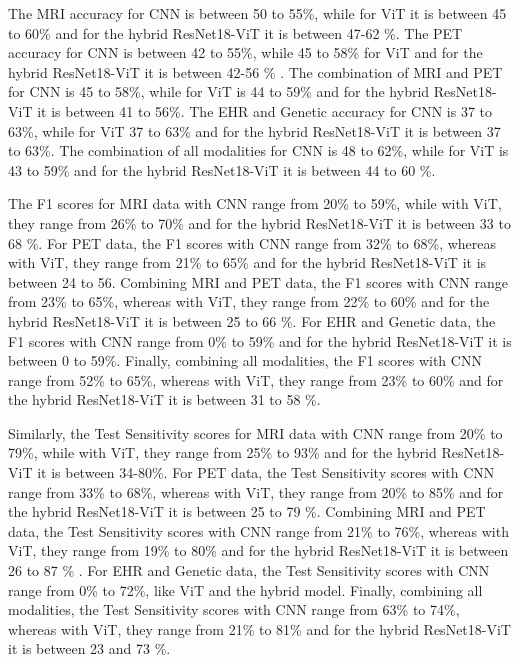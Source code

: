 The MRI accuracy for CNN is between 50 to 55\%, while for ViT it is between 45 to 60\% and for the hybrid ResNet18-ViT it is between 47-62 \%. The PET accuracy for CNN is between 42 to 55\%, while 45 to 58\% for ViT and for the hybrid ResNet18-ViT it is between 42-56 \% . The combination of MRI and PET for CNN is 45 to 58\%, while for ViT is 44 to 59\% and for the hybrid ResNet18-ViT it is between 41 to 56\%. The EHR and Genetic accuracy for CNN is 37 to 63\%, while for ViT 37 to 63\% and for the hybrid ResNet18-ViT it is between 37 to 63\%. The combination of all modalities for CNN is 48 to 62\%, while for ViT is 43 to 59\% and for the hybrid ResNet18-ViT it is between 44 to 60 \%.  

The F1 scores for MRI data with CNN range from 20\% to 59\%, while with ViT, they range from 26\% to 70\% and for the hybrid ResNet18-ViT it is between 33 to 68 \%. For PET data, the F1 scores with CNN range from 32\% to 68\%, whereas with ViT, they range from 21\% to 65\% and for the hybrid ResNet18-ViT it is between 24 to 56. Combining MRI and PET data, the F1 scores with CNN range from 23\% to 65\%, whereas with ViT, they range from 22\% to 60\% and for the hybrid ResNet18-ViT it is between 25 to 66 \%. For EHR and Genetic data, the F1 scores with CNN range from 0\% to 59\%  and for the hybrid ResNet18-ViT it is between 0 to 59\%. Finally, combining all modalities, the F1 scores with CNN range from 52\% to 65\%, whereas with ViT, they range from 23\% to 60\% and for the hybrid ResNet18-ViT it is between 31 to 58 \%. 

Similarly, the Test Sensitivity scores for MRI data with CNN range from 20\% to 79\%, while with ViT, they range from 25\% to 93\% and for the hybrid ResNet18-ViT it is between 34-80\%. For PET data, the Test Sensitivity scores with CNN range from 33\% to 68\%, whereas with ViT, they range from 20\% to 85\% and for the hybrid ResNet18-ViT it is between 25 to 79 \%. Combining MRI and PET data, the Test Sensitivity scores with CNN range from 21\% to 76\%, whereas with ViT, they range from 19\% to 80\% and for the hybrid ResNet18-ViT it is between 26 to 87 \% . For EHR and Genetic data, the Test Sensitivity scores with CNN range from 0\% to 72\%, like ViT and the hybrid model. Finally, combining all modalities, the Test Sensitivity scores with CNN range from 63\% to 74\%, whereas with ViT, they range from 21\% to 81\% and for the hybrid ResNet18-ViT it is between 23 and 73 \%. 

